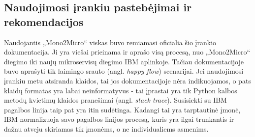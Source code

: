 \documentclass{VUMIFPSbakalaurinis}
\begin{document}
\subsection{Naudojimosi įrankiu pastebėjimai ir rekomendacijos} %
Naudojantis „Mono2Micro“ viskas buvo remiamasi oficialia šio įrankio dokumentacija. Ji yra viešai prieinama ir aprašo visą procesą, nuo „Mono2Micro“ diegimo iki naujų mikroservisų diegimo IBM aplinkoje. Tačiau dokumentacijoje buvo aprašyti tik laimingo srauto (angl. \emph{happy flow}) scenarijai. Jei naudojimosi įrankiu metu atsiranda klaidos, tai jos dokumentacijoje nėra indikuojamos, o pats klaidų formatas yra labai neinformatyvus - tai įprastai yra tik Python kalbos metodų kvietimų klaidos pranešimai (angl. \emph{stack trace}). Susisiekti su IBM pagalbos linija taip pat yra itin sudėtinga. Kadangi tai yra tarptautinė įmonė, IBM normalizuoja savo pagalbos linijos procesą, kuris yra ilgai trunkantis ir dažnu atveju skiriamas tik įmonėms, o ne individualiems asmenims.
\end{document}
